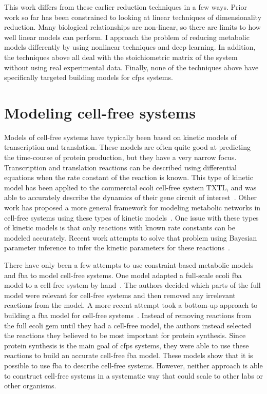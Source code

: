 This work differs from these earlier reduction techniques in a few ways.
Prior work so far has been constrained to looking at linear techniques of dimensionality reduction.
Many biological relationships are non-linear, so there are limits to how well linear models can perform.
I approach the problem of reducing metabolic models differently by using nonlinear techniques and deep learning.
In addition, the techniques above all deal with the stoichiometric matrix of the system without using real experimental data.
Finally, none of the techniques above have specifically targeted building models for \gls{cfps} systems.

\section{Modeling cell-free systems}\label{rw:mod-cf}
Models of cell-free systems have typically been based on kinetic models of transcription and translation.
These models are often quite good at predicting the time-course of protein production, but they have a very narrow focus.
Transcription and translation reactions can be described using differential equations when the rate constant of the reaction is known.
This type of kinetic model has been applied to the commercial \gls{ecoli} cell-free system TXTL, and was able to accurately describe the dynamics of their gene circuit of interest~\cite{tuza2013silico}.
Other work has proposed a more general framework for modeling metabolic networks in cell-free systems using these types of kinetic models~\cite{wayman2015dynamic}.
One issue with these types of kinetic models is that only reactions with known rate constants can be modeled accurately.
Recent work attempts to solve that problem using Bayesian parameter inference to infer the kinetic parameters for these reactions~\cite{moore2018rapid}.

There have only been a few attempts to use constraint-based metabolic models and \gls{fba} to model cell-free systems.
One model adapted a full-scale \gls{ecoli} \gls{fba} model to a cell-free system by hand~\cite{bujara2012silico}.
The authors decided which parts of the full model were relevant for cell-free systems and then removed any irrelevant reactions from the model.
A more recent attempt took a bottom-up approach to building a \gls{fba} model for cell-free systems~\cite{vilkhovoy2017sequence}.
Instead of removing reactions from the full \gls{ecoli} \gls{gem} until they had a cell-free model, the authors instead selected the reactions they believed to be most important for protein synthesis.
Since protein synthesis is the main goal of \gls{cfps} systems, they were able to use these reactions to build an accurate cell-free \gls{fba} model.
These models show that it is possible to use \gls{fba} to describe cell-free systems.
However, neither approach is able to construct cell-free systems in a systematic way that could scale to other labs or other organisms.


